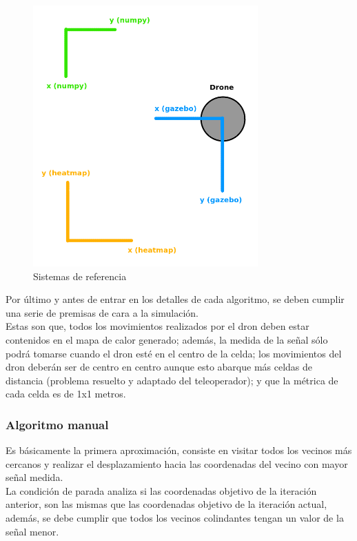 \begin{figure} [H]
    \begin{center}
    \includegraphics[height=10cm]{imagenes/cap4/8_reference_system.png}
    \end{center}
    \caption[Sistemas de referencia]{Sistemas de referencia}
    \label{fig:reference_sys}
\end{figure}

Por último y antes de entrar en los detalles de cada algoritmo, se deben cumplir una serie de premisas de cara a la simulación.\\ 

Estas son que, todos los movimientos realizados por el dron deben estar contenidos en el mapa de calor generado; además, la medida de la señal sólo podrá tomarse cuando el dron esté en el centro de la celda; los movimientos del dron deberán ser de centro en centro aunque esto abarque más celdas de distancia (problema resuelto y adaptado del teleoperador); y que la métrica de cada celda es de 1x1 metros.

\subsubsection{Algoritmo manual}
\label{subsec:alg-manual}

Es básicamente la primera aproximación, consiste en visitar todos los vecinos más cercanos y realizar el desplazamiento hacia las coordenadas del vecino con mayor señal medida.\\

La condición de parada analiza si las coordenadas objetivo de la iteración anterior, son las mismas que las coordenadas objetivo de la iteración actual, además, se debe cumplir que todos los vecinos colindantes tengan un valor de la señal menor.\\

